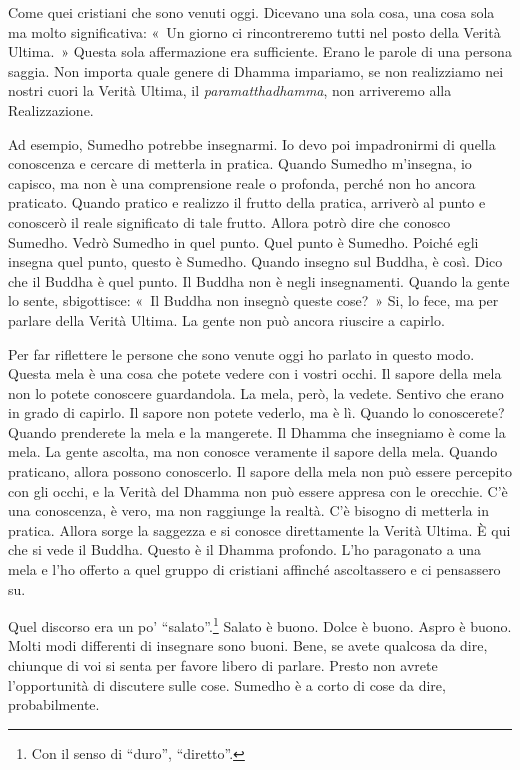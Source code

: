 Come quei cristiani che sono venuti oggi. Dicevano una sola cosa, una
cosa sola ma molto significativa: «~Un giorno ci rincontreremo tutti nel
posto della Verità Ultima.~» Questa sola affermazione era sufficiente.
Erano le parole di una persona saggia. Non importa quale genere di
Dhamma impariamo, se non realizziamo nei nostri cuori la Verità Ultima,
il \emph{paramatthadhamma}, non arriveremo alla Realizzazione.

Ad esempio, Sumedho potrebbe insegnarmi. Io devo poi impadronirmi di
quella conoscenza e cercare di metterla in pratica. Quando Sumedho
m'insegna, io capisco, ma non è una comprensione reale o profonda,
perché non ho ancora praticato. Quando pratico e realizzo il frutto
della pratica, arriverò al punto e conoscerò il reale significato di
tale frutto. Allora potrò dire che conosco Sumedho. Vedrò Sumedho in
quel punto. Quel punto è Sumedho. Poiché egli insegna quel punto, questo
è Sumedho. Quando insegno sul Buddha, è così. Dico che il Buddha è quel
punto. Il Buddha non è negli insegnamenti. Quando la gente lo sente,
sbigottisce: «~Il Buddha non insegnò queste cose?~» Si, lo fece, ma per
parlare della Verità Ultima. La gente non può ancora riuscire a capirlo.

Per far riflettere le persone che sono venute oggi ho parlato in questo
modo. Questa mela è una cosa che potete vedere con i vostri occhi. Il
sapore della mela non lo potete conoscere guardandola. La mela, però, la
vedete. Sentivo che erano in grado di capirlo. Il sapore non potete
vederlo, ma è lì. Quando lo conoscerete? Quando prenderete la mela e la
mangerete. Il Dhamma che insegniamo è come la mela. La gente ascolta, ma
non conosce veramente il sapore della mela. Quando praticano, allora
possono conoscerlo. Il sapore della mela non può essere percepito con
gli occhi, e la Verità del Dhamma non può essere appresa con le
orecchie. C'è una conoscenza, è vero, ma non raggiunge la realtà. C'è
bisogno di metterla in pratica. Allora sorge la saggezza e si conosce
direttamente la Verità Ultima. È qui che si vede il Buddha. Questo è il
Dhamma profondo. L'ho paragonato a una mela e l'ho offerto a quel gruppo
di cristiani affinché ascoltassero e ci pensassero su.

Quel discorso era un po' ``salato''.\footnote{Con il senso di ``duro'',
  ``diretto''.} Salato è buono. Dolce è buono. Aspro è buono. Molti modi
differenti di insegnare sono buoni. Bene, se avete qualcosa da dire,
chiunque di voi si senta per favore libero di parlare. Presto non avrete
l'opportunità di discutere sulle cose. Sumedho è a corto di cose da
dire, probabilmente.

